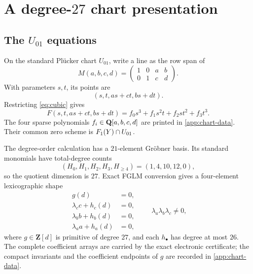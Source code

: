\section[A degree-27 chart presentation]{A degree-\(27\) chart presentation}
\label{sec:chart-scheme}

\subsection[The U01 equations]{The \(U_{01}\) equations}

On the standard Pl\"ucker chart \(U_{01}\), write a line as the row span of
\begin{equation}
 M(a,b,c,d)=
 \begin{pmatrix}
 1&0&a&b\\
 0&1&c&d
 \end{pmatrix}.
\label{eq:chart-matrix}
\end{equation}
With parameters \(s,t\), its points are
\[
 (s,t,as+ct,bs+dt).
\]
Restricting \cref{eq:cubic} gives
\begin{equation}
 F(s,t,as+ct,bs+dt)
 =f_0s^3+f_1s^2t+f_2st^2+f_3t^3.
\label{eq:restricted-cubic}
\end{equation}
The four sparse polynomials \(f_i\in\mathbf Q[a,b,c,d]\) are printed in
\cref{app:chart-data}.  Their common zero scheme is
\(F_1(Y)\cap U_{01}\).

The degree-order calculation has a \(21\)-element Gr\"obner basis.  Its
standard monomials have total-degree counts
\begin{equation}
  (H_0,H_1,H_2,H_3,H_{\ge4})=(1,4,10,12,0),
\label{eq:chart-hilbert}
\end{equation}
so the quotient dimension is \(27\).  Exact FGLM conversion gives a
four-element lexicographic shape
\begin{equation}
\begin{aligned}
 g(d)&=0,\\
 \lambda_c c+h_c(d)&=0,\\
 \lambda_b b+h_b(d)&=0,\\
 \lambda_a a+h_a(d)&=0,
\end{aligned}
\qquad
\lambda_a\lambda_b\lambda_c\ne0,
\label{eq:lex-shape}
\end{equation}
where \(g\in\mathbf Z[d]\) is primitive of degree \(27\), and each
\(h_\bullet\) has degree at most \(26\).  The complete coefficient arrays
are carried by the exact electronic certificate; the compact invariants and
the coefficient endpoints of \(g\) are recorded in
\cref{app:chart-data}.

